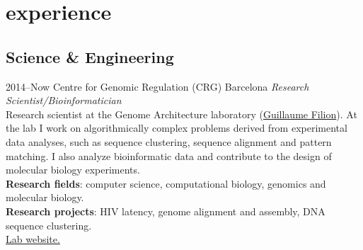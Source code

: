 \documentclass[]{friggeri-cv} %
\begin{document}

\section{experience}

\subsection{Science \& Engineering}

\begin{entrylist}


\entry
{2014--Now}
{Centre for Genomic Regulation (CRG)}
{Barcelona}
{%
\emph{Research Scientist/Bioinformatician} \\
Research scientist at the Genome Architecture laboratory
(\href{http://blog.thegrandlocus.com/}{Guillaume Filion}). At the lab
I work on algorithmically complex problems derived from experimental
data analyses, such as sequence clustering, sequence alignment and
pattern matching. I also analyze bioinformatic data and
contribute to the design of molecular biology experiments.\\
{\bf Research fields}: computer science, computational biology,
genomics and molecular biology. \\
{\bf Research projects}: HIV latency, genome alignment and assembly, DNA
sequence clustering.\\
\href{http://www.genomearchitecture.com}{{\FA \faExternalLink} Lab website.}
}


\end{entrylist}
\end{document}
